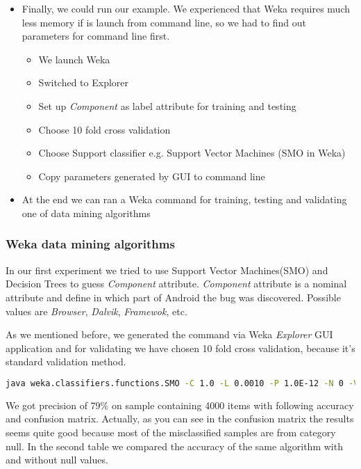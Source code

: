 \begin{itemize}
    \item Finally, we could run our example. We experienced that Weka requires much less memory if is launch from command line, so we had to find out parameters for command line first.
        \begin{itemize}
            \item We launch Weka
            \item Switched to Explorer
            \item Set up {\it Component} as label attribute for training and testing
            \item Choose 10 fold cross validation
            \item Choose Support classifier e.g. Support Vector Machines (SMO in Weka)
            \item Copy parameters generated by GUI to command line
        \end{itemize}
    \item At the end we can ran a Weka command for training, testing and validating one of data mining algorithms 
\end{itemize}

\subsubsection{Weka data mining algorithms} %
\label{ssub:Weka datamining algorithms}

In our first experiment we tried to use Support Vector Machines(SMO) and Decision Trees to guess {\it Component} attribute.  {\it Component} attribute is a nominal attribute and define in which part of Android the bug was discovered. Possible values are {\it Browser}, {\it Dalvik}, {\it Framewok}, etc.

As we mentioned before, we generated the command via Weka {\it Explorer} GUI application and for validating we have chosen 10 fold cross validation, because it's standard validation method.
\begin{lstlisting}[language=sh]
    java weka.classifiers.functions.SMO -C 1.0 -L 0.0010 -P 1.0E-12 -N 0 -V -1 -W 1 -K "weka.classifiers.functions.supportVector.PolyKernel -C 250007 -E 1.0" -t sample-vectorised.arff -c 7> smo.out
\end{lstlisting}
 We got precision of 79\% on sample containing 4000 items with following accuracy and confusion matrix.
    Actually, as you can see in the confusion matrix the results seems quite good because most of the misclassified samples are from category null.
   In the second table we compared the accuracy of the same algorithm with and without null values. 

